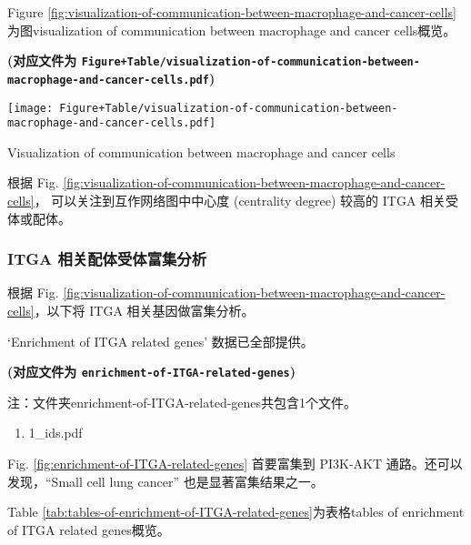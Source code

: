 \documentclass[
]{article}
\providecommand{\tightlist}{%
  \setlength{\itemsep}{0pt}\setlength{\parskip}{0pt}}
\begin{document}
Figure \ref{fig:visualization-of-communication-between-macrophage-and-cancer-cells}为图visualization of communication between macrophage and cancer cells概览。

\textbf{(对应文件为 \texttt{Figure+Table/visualization-of-communication-between-macrophage-and-cancer-cells.pdf})}

\def\@captype{figure}
\begin{center}
\texttt{[image: Figure+Table/visualization-of-communication-between-macrophage-and-cancer-cells.pdf]}
\caption{Visualization of communication between macrophage and cancer cells}\label{fig:visualization-of-communication-between-macrophage-and-cancer-cells}
\end{center}

根据 Fig. \ref{fig:visualization-of-communication-between-macrophage-and-cancer-cells}，
可以关注到互作网络图中中心度 (centrality degree) 较高的 ITGA 相关受体或配体。

\hypertarget{itga-ux76f8ux5173ux914dux4f53ux53d7ux4f53ux5bccux96c6ux5206ux6790}{%
\subsubsection{ITGA 相关配体受体富集分析}\label{itga-ux76f8ux5173ux914dux4f53ux53d7ux4f53ux5bccux96c6ux5206ux6790}}

根据 Fig. \ref{fig:visualization-of-communication-between-macrophage-and-cancer-cells}，以下将 ITGA 相关基因做富集分析。

`Enrichment of ITGA related genes' 数据已全部提供。

\textbf{(对应文件为 \texttt{enrichment-of-ITGA-related-genes})}

\begin{center}\begin{tcolorbox}[colback=gray!10, colframe=gray!50, width=0.9\linewidth, arc=1mm, boxrule=0.5pt]注：文件夹enrichment-of-ITGA-related-genes共包含1个文件。

\begin{enumerate}\tightlist
\item 1\_ids.pdf
\end{enumerate}\end{tcolorbox}
\end{center}

Fig. \ref{fig:enrichment-of-ITGA-related-genes} 首要富集到 PI3K-AKT 通路。还可以发现，``Small cell lung cancer'' 也是显著富集结果之一。

Table \ref{tab:tables-of-enrichment-of-ITGA-related-genes}为表格tables of enrichment of ITGA related genes概览。
\end{document}
